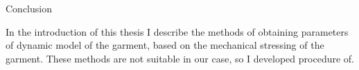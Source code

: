 \chap Conclusion

In the introduction of this thesis I describe the methods of obtaining parameters of dynamic model of the garment, based on the mechanical stressing of the garment. These methods are not suitable in our case, so I developed procedure of.



























